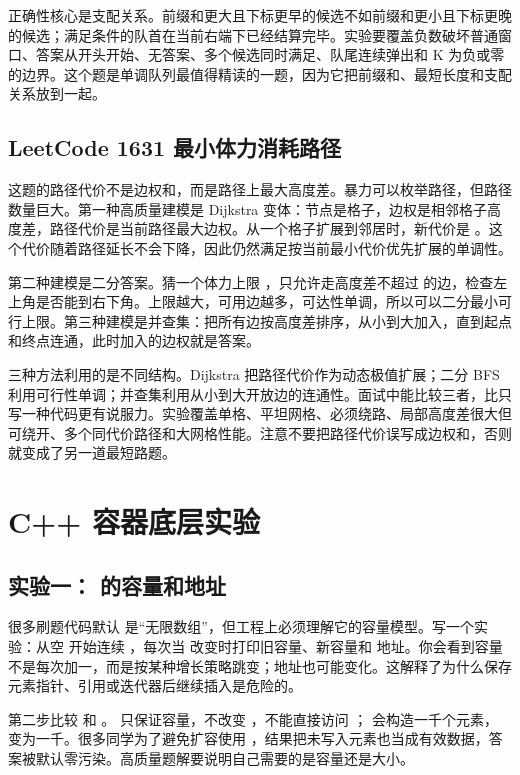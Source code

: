 正确性核心是支配关系。前缀和更大且下标更早的候选不如前缀和更小且下标更晚的候选；满足条件的队首在当前右端下已经结算完毕。实验要覆盖负数破坏普通窗口、答案从开头开始、无答案、多个候选同时满足、队尾连续弹出和 K 为负或零的边界。这个题是单调队列最值得精读的一题，因为它把前缀和、最短长度和支配关系放到一起。

\subsection{LeetCode 1631 最小体力消耗路径}

这题的路径代价不是边权和，而是路径上最大高度差。暴力可以枚举路径，但路径数量巨大。第一种高质量建模是 Dijkstra 变体：节点是格子，边权是相邻格子高度差，路径代价是当前路径最大边权。从一个格子扩展到邻居时，新代价是 。这个代价随着路径延长不会下降，因此仍然满足按当前最小代价优先扩展的单调性。

第二种建模是二分答案。猜一个体力上限 ，只允许走高度差不超过  的边，检查左上角是否能到右下角。上限越大，可用边越多，可达性单调，所以可以二分最小可行上限。第三种建模是并查集：把所有边按高度差排序，从小到大加入，直到起点和终点连通，此时加入的边权就是答案。

三种方法利用的是不同结构。Dijkstra 把路径代价作为动态极值扩展；二分 BFS 利用可行性单调；并查集利用从小到大开放边的连通性。面试中能比较三者，比只写一种代码更有说服力。实验覆盖单格、平坦网格、必须绕路、局部高度差很大但可绕开、多个同代价路径和大网格性能。注意不要把路径代价误写成边权和，否则就变成了另一道最短路题。

\section{C++ 容器底层实验}

\subsection{实验一： 的容量和地址}

很多刷题代码默认  是“无限数组”，但工程上必须理解它的容量模型。写一个实验：从空  开始连续 ，每次当  改变时打印旧容量、新容量和  地址。你会看到容量不是每次加一，而是按某种增长策略跳变；地址也可能变化。这解释了为什么保存元素指针、引用或迭代器后继续插入是危险的。

第二步比较  和 。 只保证容量，不改变 ，不能直接访问 ； 会构造一千个元素， 变为一千。很多同学为了避免扩容使用 ，结果把未写入元素也当成有效数据，答案被默认零污染。高质量题解要说明自己需要的是容量还是大小。

